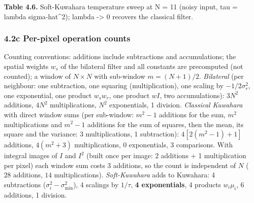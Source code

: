 \documentclass[10pt,a4paper]{article}
\begin{document}
\begin{table}[H]\centering\footnotesize{\small\textbf{Table 4.6.} Soft-Kuwahara temperature sweep at N = 11 (noisy input, tau = lambda sigma-hat\textasciicircum{}2); lambda -\textgreater{} 0 recovers the classical filter.\par}\vskip 3pt
\end{table}
\subsubsection{4.2c Per-pixel operation counts}
Counting conventions: additions include subtractions and accumulations; the spatial weights $w_s$ of the bilateral filter and all constants are precomputed (not counted); a window of $N\times N$ with sub-window $m=(N+1)/2$. \textit{Bilateral} (per neighbour: one subtraction, one squaring (multiplication), one scaling by $-1/2\sigma_r^2$, one exponential, one product $w_sw_r$, one product $wI$, two accumulations): $3N^2$ additions, $4N^2$ multiplications, $N^2$ exponentials, 1 division. \textit{Classical Kuwahara} with direct window sums (per sub-window: $m^2-1$ additions for the sum, $m^2$ multiplications and $m^2-1$ additions for the sum of squares, then the mean, its square and the variance: 3 multiplications, 1 subtraction): $4[2(m^2-1)+1]$ additions, $4(m^2+3)$ multiplications, 0 exponentials, 3 comparisons. With integral images of $I$ and $I^2$ (built once per image: 2 additions + 1 multiplication per pixel) each window sum costs 3 additions, so the count is independent of $N$ ($28$ additions, $14$ multiplications). \textit{Soft-Kuwahara} adds to Kuwahara: 4 subtractions ($\sigma_i^2-\sigma^2_{\min}$), 4 scalings by $1/\tau$, \textbf{4 exponentials}, 4 products $w_i\mu_i$, 6 additions, 1 division.
\end{document}
